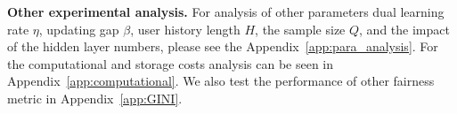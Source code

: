 \textbf{Other experimental analysis.} For analysis of other parameters dual learning rate $\eta$, updating gap $\beta$, user history length $H$, the sample size $Q$, and the impact of the hidden layer numbers, please see the Appendix~\ref{app:para_analysis}. For the computational and storage costs analysis can be seen in Appendix~\ref{app:computational}. We also test the performance of other fairness metric in Appendix~\ref{app:GINI}.


